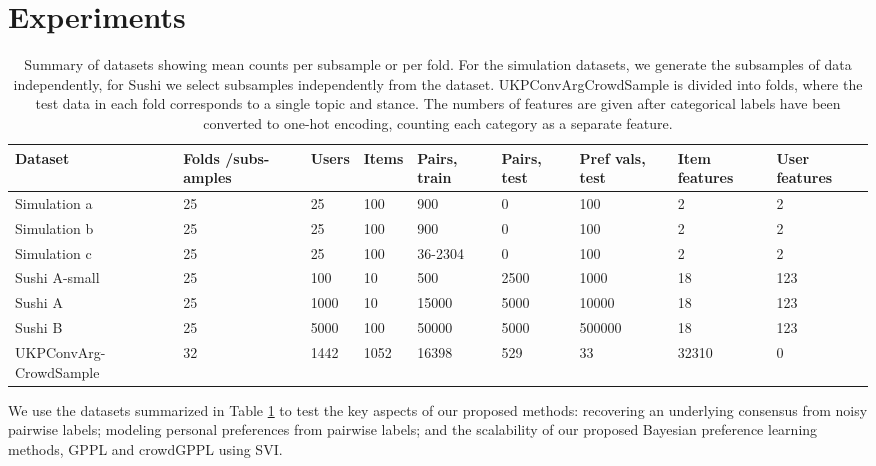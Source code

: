\section{Experiments}\label{sec:expts}


\begin{table}[h]
\small
\begin{tabularx}{\textwidth}{| p{1.8cm} | X | X | X | X | X | X | X | X |}
\hline
Dataset & Folds /subs-amples & Users & Items & Pairs, train & Pairs, test & Pref vals, test & Item features & User features \\
\hline\hline
Simulation a & 25 & 25 & 100 & 900 & 0 & 100 & 2 & 2 \\
Simulation b & 25 & 25 & 100 & 900 & 0 & 100 & 2 & 2\\
Simulation c & 25 & 25 & 100 & 36-2304 & 0 & 100 & 2 & 2\\
\hline
Sushi A-small & 25 & 100 & 10 & 500 & 2500 & 1000 & 18 & 123 \\
Sushi A & 25 & 1000 & 10 & 15000 & 5000 & 10000 & 18 & 123 \\
Sushi B & 25 & 5000 & 100 & 50000 & 5000 & 500000 &  18 & 123 \\
\hline
UKPConvArg-CrowdSample & 32 & 1442 & 1052 & 16398 & 529 & 33 & 32310 & 0
\\ \hline
\end{tabularx}
\caption{Summary of datasets showing mean counts per subsample or per fold. For the simulation datasets, we generate the subsamples of data independently, for Sushi we select subsamples independently from the dataset.  
UKPConvArgCrowdSample is divided into folds, where the test data in each fold corresponds to a single topic and stance. The numbers of features are given after categorical labels have been converted to one-hot encoding, counting
each category as a separate feature.
}
\label{tab:datasets}
\end{table}
We use the datasets summarized in Table \ref{tab:datasets} to test the key aspects of our proposed methods: recovering an underlying consensus from noisy pairwise labels; modeling personal preferences from pairwise labels; and the scalability of our proposed Bayesian preference learning methods, GPPL and crowdGPPL using SVI.
